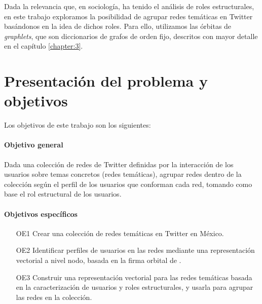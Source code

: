Dada la relevancia que, en sociología, ha tenido el análisis de roles estructurales, en este trabajo exploramos la posibilidad de agrupar redes temáticas en Twitter basándonos en la idea de dichos roles. Para ello, utilizamos las órbitas de \textit{graphlets}, que son diccionarios de grafos de orden fijo, descritos con mayor detalle en el capítulo \ref{chapter:3}.

\section{Presentación del problema y objetivos}
\label{sec:intro:motivación}

Los objetivos de este trabajo son los siguientes: 

\paragraph{Objetivo general}
Dada una colección de redes de Twitter definidas por la interacción de los usuarios sobre temas concretos (redes temáticas), agrupar redes dentro de la colección según el perfil de los usuarios que conforman cada red, tomando como base el rol estructural de los usuarios.

\paragraph{Objetivos específicos}


\begin{itemize}
    \item[OE1] Crear una colección de redes temáticas en Twitter en México.
    \item[OE2] Identificar perfiles de usuarios en las redes mediante una representación vectorial a nivel nodo, basada en la firma orbital de \graphlets. 
    \item[OE3] Construir una representación vectorial para las redes temáticas basada en la caracterización de usuarios y roles estructurales, y usarla para agrupar las redes en la colección.
\end{itemize}

